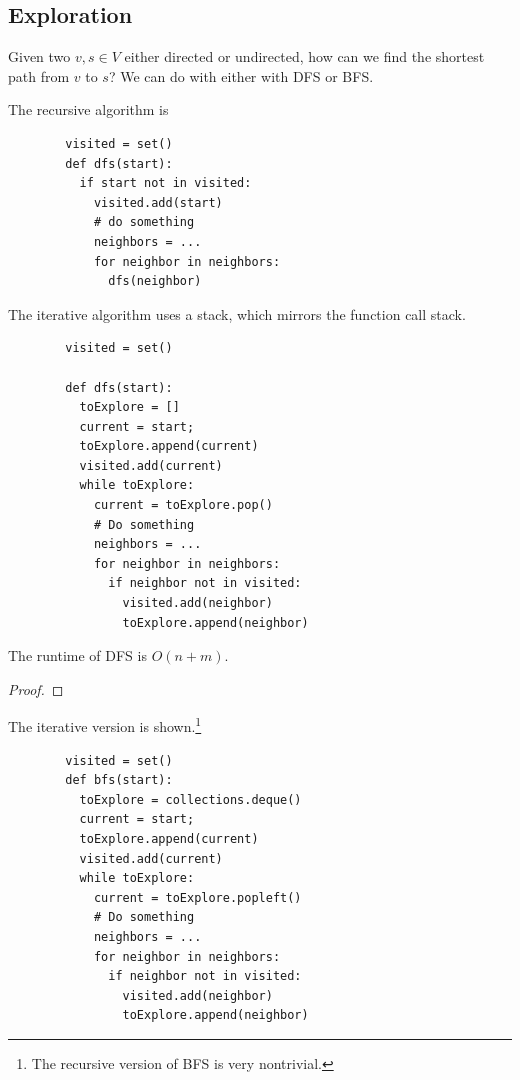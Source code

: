 \documentclass{article}
\begin{document}
  \subsection{Exploration}

    Given two $v, s \in V$ either directed or undirected, how can we find the shortest path from $v$ to $s$? We can do with either with DFS or BFS. 

    \begin{definition}[DFS]
      The recursive algorithm is 
      \begin{lstlisting}
        visited = set() 
        def dfs(start): 
          if start not in visited: 
            visited.add(start) 
            # do something 
            neighbors = ... 
            for neighbor in neighbors: 
              dfs(neighbor)
      \end{lstlisting}

      The iterative algorithm uses a stack, which mirrors the function call stack. 
      \begin{lstlisting}
        visited = set() 

        def dfs(start): 
          toExplore = [] 
          current = start; 
          toExplore.append(current) 
          visited.add(current) 
          while toExplore: 
            current = toExplore.pop() 
            # Do something
            neighbors = ... 
            for neighbor in neighbors: 
              if neighbor not in visited: 
                visited.add(neighbor) 
                toExplore.append(neighbor)
      \end{lstlisting}
    \end{definition}

    \begin{theorem}
      The runtime of DFS is $O(n+m)$. 
    \end{theorem}
    \begin{proof}
      
    \end{proof}

    \begin{definition}[BFS]
      The iterative version is shown.\footnote{The recursive version of BFS is very nontrivial.}
      \begin{lstlisting}
        visited = set() 
        def bfs(start): 
          toExplore = collections.deque() 
          current = start; 
          toExplore.append(current) 
          visited.add(current) 
          while toExplore: 
            current = toExplore.popleft() 
            # Do something 
            neighbors = ... 
            for neighbor in neighbors: 
              if neighbor not in visited: 
                visited.add(neighbor) 
                toExplore.append(neighbor)
      \end{lstlisting}
    \end{definition}
\end{document}
